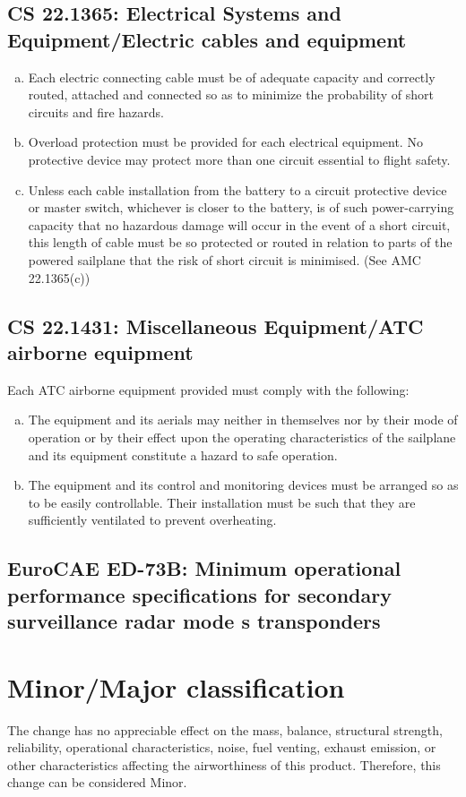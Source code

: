\documentclass{article}
\begin{document}
\subsection{CS 22.1365:  Electrical Systems and Equipment/Electric cables and equipment}
\begin{enumerate}[(a)] 
\item Each electric connecting cable must be of adequate capacity and correctly routed, attached and connected so as to minimize the probability of short circuits and fire hazards.
\item Overload protection must be provided for each electrical equipment. No protective device may protect more than one circuit essential to flight safety.
\item Unless each cable installation from the battery to a circuit protective device or master switch, whichever is closer to the battery, is of such power-carrying capacity that no hazardous damage will occur in the event of a short circuit, this length of cable must be so protected or routed in relation to parts of the powered sailplane that the risk of short circuit is minimised. (See AMC 22.1365(c))
\end{enumerate}

\subsection{CS 22.1431:  Miscellaneous Equipment/ATC airborne equipment}
Each ATC airborne equipment provided must comply with the following:
\begin{enumerate}[(a)]
\item The equipment and its aerials may neither in themselves nor by their mode of operation or by their effect upon the operating characteristics of the sailplane and its equipment constitute a hazard to safe operation.
\item The equipment and its control and monitoring devices must be arranged so as to be easily controllable. Their installation must be such that they are sufficiently ventilated to prevent overheating.
\end{enumerate}


\subsection{EuroCAE ED-73B: Minimum operational performance specifications for secondary surveillance radar mode s transponders}

\section{Minor/Major classification}
The change has no appreciable effect on the mass, balance, structural strength, reliability, operational characteristics, noise, fuel venting, exhaust emission, or other characteristics affecting the airworthiness of this product. Therefore, this change can be considered Minor.
\end{document}
